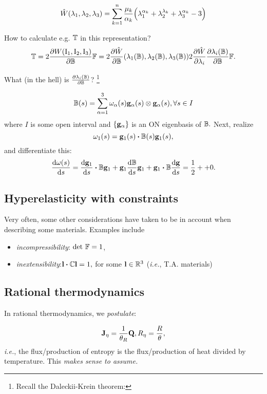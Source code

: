 \documentclass[reqno, a4paper]{article}
\begin{document}
\begin{example}
	\[
		\hat{W}\qty(\lambda_1,\lambda_2,\lambda_3) = \sum_{k=1}^n \frac{\mu_k}{\alpha_k}\qty(\lambda_1^{\alpha_k}+\lambda_2^{\lambda_k}+\lambda_3^{\alpha_k}-3)
	\]
\end{example}
How to calculate e.g. $\mathbb{T}$ in this representation?
\[
	\mathbb{T} = 2 \pdv{W\qty(\operatorname{I_1}, \operatorname{I_2}, \operatorname{I_3})}{\ensuremath{\mathbb{B}}}\mathbb{F} = 2 \pdv{\hat{W}}{\ensuremath{\mathbb{B}}}\qty(\lambda_1\qty(\mathbb{B}), \lambda_2\qty(\mathbb{B}), \lambda_3\qty(\mathbb{B})) 2 \pdv{\hat{W}}{\lambda_i}\pdv{\lambda_i\qty(\ensuremath{\mathbb{B}})}{\ensuremath{\mathbb{B}}}\mathbb{F}.
\]

What (in the hell) is $\pdv{\lambda_i\qty(\ensuremath{\mathbb{B}})}{\ensuremath{\mathbb{B}}}$? \footnote{Recall the Daleckii-Krein theorem:}

\[
	\mathbb{B}(s) = \sum_{\alpha = 1}^3 \omega_{\alpha}(s) \vb{g}_{\alpha}(s) \otimes \vb{g}_{\alpha}(s), \forall s \in I
\]
where $I$ is some open interval and $\{\vb{g}_{\alpha}\}$ is an ON eigenbasis of $\mathbb{B}.$ Next, realize
\[
	\omega_1(s) = \vb{g}_1(s)\vdot \lcg(s) \vb{g}_1(s),
\]
and differentiate this:
\[
	\dv{\omega(s)}{s} = \dv{\vb{g}_1}{s}\vdot \lcg \vb{g}_1  + \vb{g}_1 \dv{\lcg}{s}\vb{g}_1+\vb{g}_1 \vdot \lcg \dv{\vb{g}}{s} = \frac{1}{2} + +0.
\]

\subsection{Hyperelasticity with constraints}
\label{sec:constraints}
Very often, some other considerations have taken to be in account when describing some materials. Examples include

\begin{itemize}
	\item \textit{incompressibility}: $\det\, \mathbb{F} = 1$,
	\item \textit{inextensibility}:$\vb{l} \vdot \rcg \vb{l} = 1,$ for some $\vb{l} \in {\mathbb R}^{3}$ (\textit{i.e.}, T.A. materials)
\end{itemize}

\subsection{Rational thermodynamics}
\label{sec:rational_thermodynamics}

In rational thermodynamics, we \textit{postulate}:

\begin{equation}
	\label{eq:rational}
	\vb{J}_{\eta} = \frac{1}{\theta_R} \vb{Q}, R_{\eta} = \frac{R}{\theta},
\end{equation}
\textit{i.e.}, the flux/production of entropy is the flux/production of heat divided by temperature. This \textit{makes sense to assume.}
\end{document}
